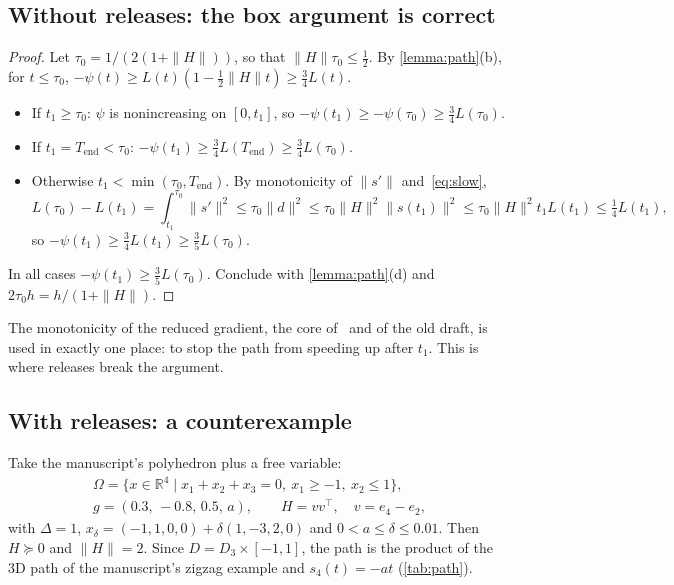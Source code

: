 \documentclass[11pt,a4paper]{article}
\numberwithin{equation}{section}
\theoremstyle{plain}
\newtheorem{proposition}[theorem]{Proposition}
\theoremstyle{definition}
\theoremstyle{remark}
\newcommand{\R}{\mathbb{R}}
\newcommand{\Tend}{T_{\mathrm{end}}}
\begin{document}
\subsection{Without releases: the box argument is correct}\label{subsec:nested}


\begin{proof}
Let $\tau_0=1/(2(1+\|H\|))$, so that $\|H\|\tau_0\le\frac12$. By \cref{lemma:path}(b), for
$t\le\tau_0$, $-\psi(t)\ge L(t)(1-\tfrac12\|H\|t)\ge\tfrac34L(t)$.
\begin{itemize}
\item If $t_1\ge\tau_0$: $\psi$ is nonincreasing on $[0,t_1]$, so
  $-\psi(t_1)\ge-\psi(\tau_0)\ge\frac34L(\tau_0)$.
\item If $t_1=\Tend<\tau_0$: $-\psi(t_1)\ge\frac34L(\Tend)\ge\frac34L(\tau_0)$.
\item Otherwise $t_1<\min(\tau_0,\Tend)$. By monotonicity of $\|s'\|$ and~\eqref{eq:slow},
  \[
    L(\tau_0)-L(t_1)=\int_{t_1}^{\tau_0}\|s'\|^2\le\tau_0\|d\|^2\le\tau_0\|H\|^2\|s(t_1)\|^2
    \le\tau_0\|H\|^2t_1L(t_1)\le\tfrac14L(t_1),
  \]
  so $-\psi(t_1)\ge\frac34L(t_1)\ge\frac35L(\tau_0)$.
\end{itemize}
In all cases $-\psi(t_1)\ge\frac35L(\tau_0)$. Conclude with \cref{lemma:path}(d) and
$2\tau_0h=h/(1+\|H\|)$.
\end{proof}

The monotonicity of the reduced gradient, the core of~\cite{CGT88} and of the old draft, is
used in exactly one place: to stop the path from speeding up after $t_1$. This is where
releases break the argument.

\subsection{With releases: a counterexample}\label{subsec:counterexample}

Take the manuscript's polyhedron plus a free variable:
\begin{gather*}
  \Omega=\{x\in\R^4\mid x_1+x_2+x_3=0,\ x_1\ge-1,\ x_2\le1\},\\
  g=(0.3,\,-0.8,\,0.5,\,a),\qquad H=vv^\top,\quad v=e_4-e_2,
\end{gather*}
with $\Delta=1$, $x_\delta=(-1,1,0,0)+\delta(1,-3,2,0)$ and $0<a\le\delta\le0.01$. Then
$H\succeq0$ and $\|H\|=2$. Since $D=D_3\times[-1,1]$, the path is the product of the 3D path of
the manuscript's zigzag example and $s_4(t)=-at$ (\cref{tab:path}).
\end{document}
